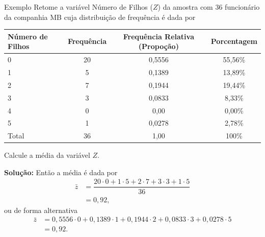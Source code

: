 \documentclass[8pt]{beamer}
\begin{document}
\begin{frame}{Exemplo}
 Retome a variável Número de Filhos ($Z$) da amostra com 36 funcionário da companhia MB cuja distribuição de frequência é dada por
 
 {\tiny
 \begin{table}
  \centering
  \begin{tabular}{l|ccc}
    \toprule[0.05cm]
    Número de Filhos & Frequência & Frequência Relativa (Propoção) & Porcentagem\\
    \midrule[0.05cm]
    0 & 20 & 0,5556 & 55,56\% \\
    1 & 5 & 0,1389 & 13,89\% \\
    2 & 7 & 0,1944 & 19,44\% \\
    3 & 3 & 0,0833 & 8,33\% \\
    4 & 0 & 0,00 & 0,00\% \\
    5 & 1 & 0,0278 & 2,78\% \\ \midrule[0,05cm]
    Total & 36 & 1,00 & 100\% \\ \bottomrule[0,05cm]
  \end{tabular}
 \end{table}
 }
 
Calcule a média da variável $Z$.

{\small
\textbf{Solução:} Então a média é dada por
\begin{align*}
 \bar{z} &=  \dfrac{20 \cdot 0 + 1 \cdot 5 + 2\cdot 7 + 3 \cdot 3 + 1 \cdot 5}{36}\\
 &= 0,92,
\end{align*}
ou de forma alternativa
\begin{align*}
 \bar{z} &= 0,5556 \cdot 0 + 0,1389 \cdot 1 + 0,1944 \cdot 2 + 0,0833 \cdot 3 + 0,0278 \cdot 5\\
 &= 0,92.
\end{align*}
}

\end{frame}
\end{document}
